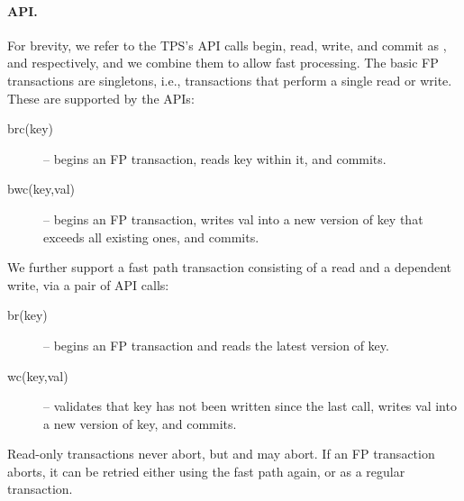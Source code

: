 \paragraph{API.}
For brevity, we refer to the TPS's API calls  begin, read, write, and commit as , and  respectively, and 
we combine them to allow fast processing.
The basic FP transactions are singletons, i.e., transactions that perform a single
read or write. These are supported by the APIs: 
\begin{description}
\item[brc(key)] -- begins an FP transaction, reads key within it, and commits.
\item[bwc(key,val)] -- begins an FP transaction,  writes val into a new version of key that exceeds all existing ones, and commits.
\end{description}

We further support a fast path transaction consisting of a read and a dependent write, via a pair of API calls:
\begin{description}
\item[br(key)] -- begins an FP transaction and  reads the latest version of key.
\item[wc(key,val)] -- 	validates that key has not been written since the last  call, writes val into a new version of key, and commits.
\end{description}

Read-only transactions never abort, but  and  may abort. 
If an FP transaction aborts, it can be retried either using the fast path again, or as a regular transaction.

